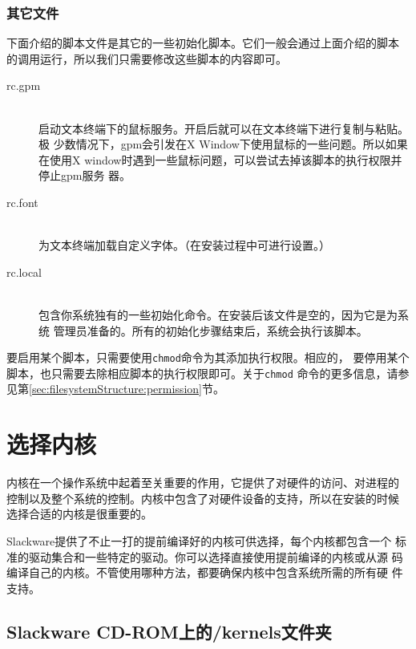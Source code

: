 \subsubsection{其它文件}
\label{sec:systemConfig:systemOverview:etcRcd:otherFiles}
下面介绍的脚本文件是其它的一些初始化脚本。它们一般会通过上面介绍的脚本
的调用运行，所以我们只需要修改这些脚本的内容即可。
\begin{description}
\item[rc.gpm] \hfill \\
  启动文本终端下的鼠标服务。开启后就可以在文本终端下进行复制与粘贴。极
  少数情况下，gpm会引发在X Window下使用鼠标的一些问题。所以如果在使用X
  window时遇到一些鼠标问题，可以尝试去掉该脚本的执行权限并停止gpm服务
  器。
\item[rc.font] \hfill \\
  为文本终端加载自定义字体。（在安装过程中可进行设置。）
\item[rc.local] \hfill \\
  包含你系统独有的一些初始化命令。在安装后该文件是空的，因为它是为系统
  管理员准备的。所有的初始化步骤结束后，系统会执行该脚本。
\end{description}

要启用某个脚本，只需要使用\texttt{chmod}命令为其添加执行权限。相应的，
要停用某个脚本，也只需要去除相应脚本的执行权限即可。关于\texttt{chmod}
命令的更多信息，请参见第\ref{sec:filesystemStructure:permission}节。

\section{选择内核}
\label{sec:systemConfig:selectingAKernel}
内核在一个操作系统中起着至关重要的作用，它提供了对硬件的访问、对进程的
控制以及整个系统的控制。内核中包含了对硬件设备的支持，所以在安装的时候
选择合适的内核是很重要的。

Slackware提供了不止一打的提前编译好的内核可供选择，每个内核都包含一个
标准的驱动集合和一些特定的驱动。你可以选择直接使用提前编译的内核或从源
码编译自己的内核。不管使用哪种方法，都要确保内核中包含系统所需的所有硬
件支持。

\subsection{Slackware CD-ROM上的/kernels文件夹}
\label{sec:systemConfig:selectingAKernel:kernelsDirctory}

